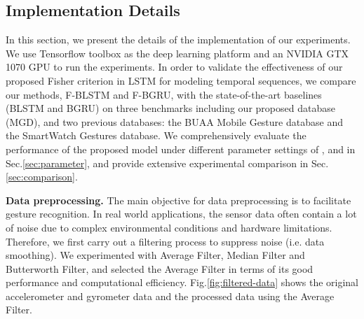 \documentclass[review]{elsarticle}
\begin{document}
\subsection{Implementation Details}\label{sec:preprocess}In this section, we present the details of the implementation of our experiments. We use Tensorflow toolbox as the deep learning platform and an NVIDIA GTX 1070 GPU to run the experiments. In order to validate the effectiveness of our proposed Fisher criterion in LSTM for modeling temporal sequences, we compare our methods, F-BLSTM and F-BGRU, with the state-of-the-art baselines (BLSTM and BGRU\;\cite{chung2014eprint}) on three benchmarks including our proposed database (MGD), and two previous databases: the BUAA Mobile Gesture database\;\cite{xie2016ccbr} and the SmartWatch Gestures database\;\cite{chung2014eprint}. We comprehensively evaluate the performance of the proposed model under different parameter settings of ,  and  in Sec.\;\ref{sec:parameter}, and provide extensive experimental comparison in Sec.\;\ref{sec:comparison}.

\textbf{Data preprocessing.} The main objective for data preprocessing is to facilitate gesture recognition. In real world applications, the sensor data often contain a lot of noise due to complex environmental conditions and hardware limitations. Therefore, we first carry out a filtering process to suppress noise (i.e. data smoothing). We experimented with Average Filter, Median Filter and Butterworth Filter, and selected the Average Filter in terms of its good performance and computational efficiency. Fig.\;\ref{fig:filtered-data} shows the original accelerometer and gyrometer data and the processed data using the Average Filter.

\begin{figure*}[htbp]
	\normalsize
	\centering
	\\
	\\
	\caption{The original accelerometer and gyrometer data vs. the processed data by Moving Average Filter.}
	\label{fig:filtered-data}
	\vspace*{4pt}
\end{figure*}
\end{document}
